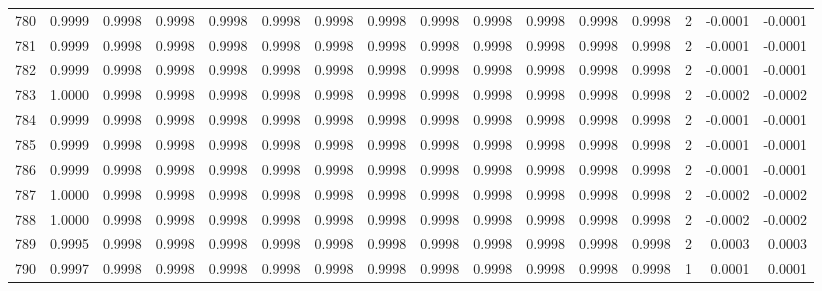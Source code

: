 \begin{tabular}{lrrrrrrrrrrrrrrr}
780 &      0.9999 &  0.9998 &  0.9998 &  0.9998 &  0.9998 &  0.9998 &  0.9998 &  0.9998 &  0.9998 &  0.9998 &   0.9998 &     0.9998 &      2 &                   -0.0001 &                    -0.0001 \\
781 &      0.9999 &  0.9998 &  0.9998 &  0.9998 &  0.9998 &  0.9998 &  0.9998 &  0.9998 &  0.9998 &  0.9998 &   0.9998 &     0.9998 &      2 &                   -0.0001 &                    -0.0001 \\
782 &      0.9999 &  0.9998 &  0.9998 &  0.9998 &  0.9998 &  0.9998 &  0.9998 &  0.9998 &  0.9998 &  0.9998 &   0.9998 &     0.9998 &      2 &                   -0.0001 &                    -0.0001 \\
783 &      1.0000 &  0.9998 &  0.9998 &  0.9998 &  0.9998 &  0.9998 &  0.9998 &  0.9998 &  0.9998 &  0.9998 &   0.9998 &     0.9998 &      2 &                   -0.0002 &                    -0.0002 \\
784 &      0.9999 &  0.9998 &  0.9998 &  0.9998 &  0.9998 &  0.9998 &  0.9998 &  0.9998 &  0.9998 &  0.9998 &   0.9998 &     0.9998 &      2 &                   -0.0001 &                    -0.0001 \\
785 &      0.9999 &  0.9998 &  0.9998 &  0.9998 &  0.9998 &  0.9998 &  0.9998 &  0.9998 &  0.9998 &  0.9998 &   0.9998 &     0.9998 &      2 &                   -0.0001 &                    -0.0001 \\
786 &      0.9999 &  0.9998 &  0.9998 &  0.9998 &  0.9998 &  0.9998 &  0.9998 &  0.9998 &  0.9998 &  0.9998 &   0.9998 &     0.9998 &      2 &                   -0.0001 &                    -0.0001 \\
787 &      1.0000 &  0.9998 &  0.9998 &  0.9998 &  0.9998 &  0.9998 &  0.9998 &  0.9998 &  0.9998 &  0.9998 &   0.9998 &     0.9998 &      2 &                   -0.0002 &                    -0.0002 \\
788 &      1.0000 &  0.9998 &  0.9998 &  0.9998 &  0.9998 &  0.9998 &  0.9998 &  0.9998 &  0.9998 &  0.9998 &   0.9998 &     0.9998 &      2 &                   -0.0002 &                    -0.0002 \\
789 &      0.9995 &  0.9998 &  0.9998 &  0.9998 &  0.9998 &  0.9998 &  0.9998 &  0.9998 &  0.9998 &  0.9998 &   0.9998 &     0.9998 &      2 &                    0.0003 &                     0.0003 \\
790 &      0.9997 &  0.9998 &  0.9998 &  0.9998 &  0.9998 &  0.9998 &  0.9998 &  0.9998 &  0.9998 &  0.9998 &   0.9998 &     0.9998 &      1 &                    0.0001 &                     0.0001 \\

\end{tabular}
